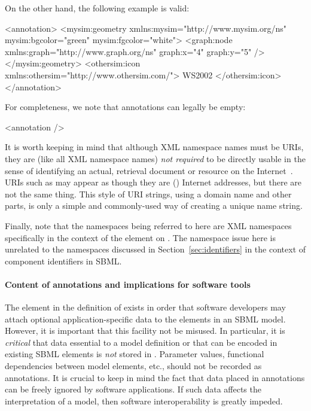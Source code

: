 On the other hand, the following example is valid:

\begin{example}
<annotation>
    <mysim:geometry xmlns:mysim="http://www.mysim.org/ns"
             mysim:bgcolor="green" mysim:fgcolor="white">
        <graph:node xmlns:graph="http://www.graph.org/ns" 
             graph:x="4" graph:y="5" />
    </mysim:geometry>
    <othersim:icon xmlns:othersim="http://www.othersim.com/">
        WS2002
    </othersim:icon>
</annotation>
\end{example}

For completeness, we note that annotations can legally be empty:

\begin{example}
<annotation />
\end{example}

It is worth keeping in mind that although XML namespace names must
be URIs, they are (like all XML namespace names) \emph{not
  required} to be directly usable in the sense of identifying an
actual, retrieval document or resource on the
Internet~\citep{bray:1999}.  URIs such as
 may appear as though they are (\eg)
Internet addresses, but there are not the same thing.  This style
of URI strings, using a domain name and other parts, is only a
simple and commonly-used way of creating a unique name string.

Finally, note that the namespaces being referred to here are XML
namespaces specifically in the context of the 
element on \SBase.  The namespace issue here is unrelated to the
namespaces discussed in Section~\ref{sec:identifiers} in the
context of component identifiers in SBML.


\paragraph{Content of annotations and implications for software tools}

The  element in the definition of \SBase exists in
order that software developers may attach optional
application-specific data to the elements in an SBML model.
However, it is important that this facility not be misused.  In
particular, it is \emph{critical} that data essential to a model
definition or that can be encoded in existing SBML elements is
\emph{not} stored in . Parameter values,
functional dependencies between model elements, etc., should not
be recorded as annotations.  It is crucial to keep in mind the
fact that data placed in annotations can be freely ignored by
software applications.  If such data affects the interpretation of
a model, then software interoperability is greatly impeded.

